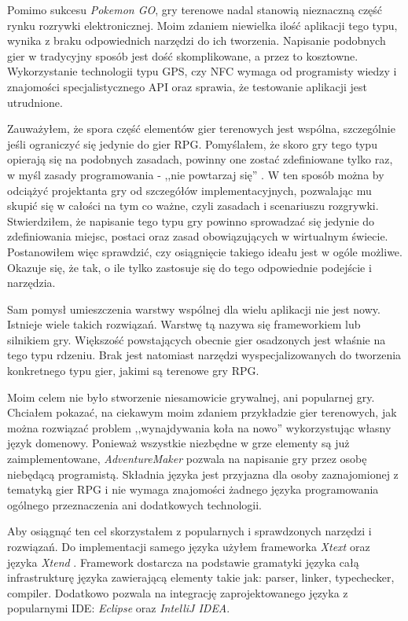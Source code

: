 \documentclass[openright]{xmgr}
\begin{document}
Pomimo sukcesu \textit{Pokemon GO}, gry terenowe nadal stanowią nieznaczną część rynku rozrywki elektronicznej. Moim zdaniem niewielka ilość aplikacji tego typu, wynika z braku odpowiednich narzędzi do ich tworzenia. Napisanie podobnych gier w tradycyjny sposób jest dość skomplikowane, a przez to kosztowne. Wykorzystanie technologii typu GPS, czy NFC wymaga od programisty wiedzy i znajomości specjalistycznego API oraz sprawia, że testowanie aplikacji jest utrudnione.

Zauważyłem, że spora część elementów gier terenowych jest wspólna, szczególnie jeśli ograniczyć się jedynie do gier RPG. Pomyślałem, że skoro gry tego typu opierają się na podobnych zasadach, powinny one zostać zdefiniowane tylko raz, w myśl zasady programowania - ,,nie powtarzaj się'' \cite{CleanCode:2005}. W ten sposób można by odciążyć projektanta gry od szczegółów implementacyjnych, pozwalając mu skupić się w całości na tym co ważne, czyli zasadach i scenariuszu rozgrywki. Stwierdziłem, że napisanie tego typu gry powinno sprowadzać się jedynie do zdefiniowania miejsc, postaci oraz zasad obowiązujących w wirtualnym świecie. Postanowiłem więc sprawdzić, czy osiągnięcie takiego ideału jest w ogóle możliwe. Okazuje się, że tak, o ile tylko zastosuje się do tego odpowiednie podejście i narzędzia.

Sam pomysł umieszczenia warstwy wspólnej dla wielu aplikacji nie jest nowy. Istnieje wiele takich rozwiązań. Warstwę tą nazywa się frameworkiem lub silnikiem gry. Większość powstających obecnie gier osadzonych jest właśnie na tego typu rdzeniu. Brak jest natomiast narzędzi wyspecjalizowanych do tworzenia konkretnego typu gier, jakimi są terenowe gry RPG.

Moim celem nie było stworzenie niesamowicie grywalnej, ani popularnej gry. Chciałem pokazać, na ciekawym moim zdaniem przykładzie gier terenowych, jak można rozwiązać problem ,,wynajdywania koła na nowo'' wykorzystując własny język domenowy. Ponieważ wszystkie niezbędne w grze elementy są już zaimplementowane, \textit{AdventureMaker} pozwala na napisanie gry przez osobę niebędącą programistą. Składnia języka jest przyjazna dla osoby zaznajomionej z tematyką gier RPG i nie wymaga znajomości żadnego języka programowania ogólnego przeznaczenia ani dodatkowych technologii.

Aby osiągnąć ten cel skorzystałem z popularnych i sprawdzonych narzędzi i rozwiązań. Do implementacji samego języka użyłem frameworka \textit{Xtext} oraz języka \textit{Xtend} \cite{Xtend:2017:Doc}. Framework dostarcza na podstawie gramatyki języka całą infrastrukturę języka zawierającą elementy takie jak: parser, linker, typechecker, compiler. Dodatkowo pozwala na integrację zaprojektowanego języka z popularnymi IDE: \textit{Eclipse} oraz \textit{IntelliJ IDEA}. 
\end{document}
